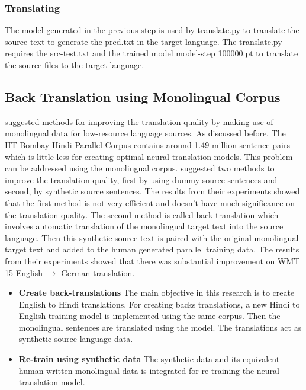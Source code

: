 \subsubsection{Translating}
The model generated in the previous step is used by translate.py to translate the source text to generate the pred.txt in the target language. The translate.py requires the src-test.txt and the trained model model-step$\_$100000.pt to  translate the source files to the target language. 

\subsection{Back Translation using Monolingual Corpus}
\label{backtrans}
\cite{DBLP:journals/corr/SennrichHB15a} suggested methods for improving the translation quality by making use of monolingual data for low-resource language sources. As discussed before, The IIT-Bombay Hindi Parallel Corpus contains around 1.49 million sentence pairs which is little less for creating optimal neural translation models. This problem can be addressed using the monolingual corpus.\cite{DBLP:journals/corr/SennrichHB15a} suggested two methods to improve the translation quality, first by using dummy source sentences and second, by synthetic source sentences. The results from their experiments showed that the first method is not very efficient and doesn't have much significance on the translation quality. The second method is called back-translation which involves automatic translation of
the monolingual target text into the source language. Then this synthetic source text is paired with the original monolingual target text and added to the human generated parallel training data. The results from their experiments showed that there was substantial improvement on WMT 15 English $\rightarrow$ German translation. 

\begin{itemize}
    \item \textbf{Create back-translations} The main objective in this research is to create English to Hindi translations. For creating backs translations, a new Hindi to English training model is implemented using the same corpus. Then the monolingual sentences are translated using the model. The translations act as synthetic source language data.
    \item \textbf{Re-train using synthetic data} The synthetic data and its equivalent human written monolingual data is integrated for re-training the neural translation model.
\end{itemize}

